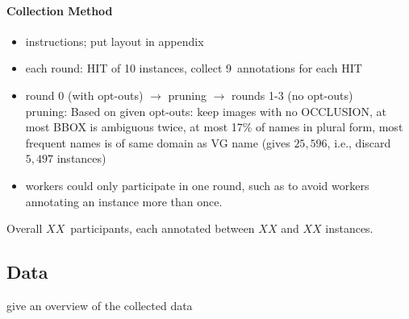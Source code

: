 \paragraph{Collection Method}
\begin{itemize}
	\item instructions; put layout in appendix
	\item each round: HIT of 10 instances, collect 9~annotations for each HIT
	\item round 0 (with opt-outs) $\rightarrow$ pruning $\rightarrow$ rounds 1-3 (no opt-outs)\\
	pruning: Based on given opt-outs: keep images with no OCCLUSION, at most BBOX is ambiguous twice, at most 17\% of names in plural form, most frequent names is of same domain as VG name (gives $25,596$, i.e., discard $5,497$ instances)
	\item workers could only participate in one round, such as to avoid workers annotating an instance more than once. 
\end{itemize}

Overall $XX$~participants, each annotated between $XX$ and $XX$ instances. 

\subsection{Data} give an overview of the collected data



